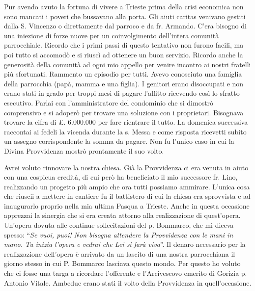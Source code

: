 Pur avendo avuto la fortuna di vivere a Trieste prima della crisi economica non sono mancati i 
poveri che bussavano alla porta. Gli aiuti caritas venivano gestiti dalla S. Vincenzo o 
direttamente dal parroco e da fr. Armando. C’era bisogno di una iniezione di forze nuove per un 
coinvolgimento dell’intera comunità parrocchiale. Ricordo che i primi passi di questo tentativo 
non furono facili, ma poi tutto si accomodò e si riuscì ad ottenere un buon servizio. Ricordo 
anche la generosità della comunità ad ogni mio appello per venire incontro ai nostri fratelli più 
sfortunati. Rammento un episodio per tutti. Avevo conosciuto una famiglia della parrocchia 
(papà, mamma e una figlia). I genitori erano disoccupati e non erano stati in grado per troppi 
mesi di pagare l’affitto ricevendo così lo sfratto esecutivo. Parlai con l’amministratore del 
condominio che si dimostrò comprensivo e si adoperò per trovare una soluzione con i proprietari. 
Bisognava trovare la cifra di £. 6.000.000 per fare rientrare il tutto. La domenica successiva 
raccontai ai fedeli la vicenda durante la s. Messa e come risposta ricevetti subito un assegno 
corrispondente la somma da pagare. Non fu l’unico caso in cui la Divina Provvidenza mostrò 
prontamente il suo volto.

Avrei voluto rinnovare la nostra chiesa. Già la Provvidenza ci era venuta in aiuto con una 
cospicua eredità, di cui però ha beneficiato il mio successore fr. Lino, realizzando un progetto 
più ampio che ora tutti possiamo ammirare. L’unica cosa che riuscii a mettere in cantiere fu il 
battistero di cui la chiesa era sprovvista e ad inaugurarlo proprio nella mia ultima Pasqua a 
Trieste. Anche in questa occasione apprezzai la sinergia che si era creata attorno alla 
realizzazione di quest’opera. Un’opera dovuta alle continue sollecitazioni del p. Bommarco, che 
mi diceva spesso: “\textit{Se vuoi, puoi! Non bisogna attendere la Provvidenza con le mani in mano.
Tu inizia l’opera e vedrai che Lei si farà viva}”. Il denaro necessario per la realizzazione
dell’opera è arrivato da un lascito di una nostra parrocchiana il giorno stesso in cui P. Bommarco 
lasciava questo mondo. Per questo ho voluto che ci fosse una targa a ricordare l’offerente e 
l’Arcivescovo emerito di Gorizia p. Antonio Vitale. Ambedue erano stati il volto della 
Provvidenza in quell’occasione.

